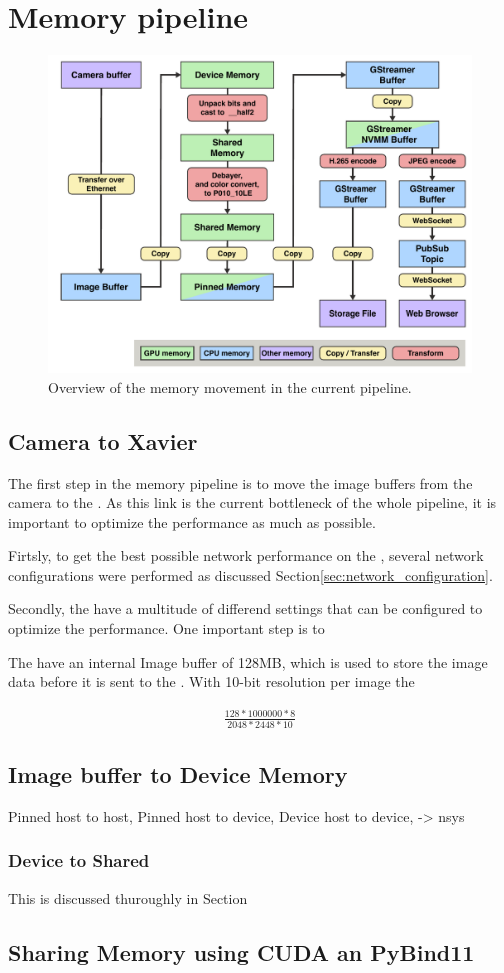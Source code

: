 \section{Memory pipeline}

\begin{figure}[H]
    \centering
    \includegraphics[width=\textwidth]{figures/memory_pipeline/current.pdf}
    \caption{Overview of the memory movement in the current pipeline.}
    \label{fig:pipeline_current}
\end{figure}



\subsection{Camera to Xavier}
The first step in the memory pipeline is to move the image buffers from the camera to the \jx.
As this link is the current bottleneck of the whole pipeline, it is important to optimize the performance as much as possible.

Firtsly, to get the best possible network performance on the \jx, several network configurations were performed as discussed Section\ref{sec:network_configuration}.

Secondly, the \cams have a multitude of differend settings that can be configured to optimize the performance.
One important step is to

The \cams have an internal Image buffer of 128MB, which is used to store the image data before it is sent to the \jx.
With 10-bit resolution per image the


\begin{align}
    \frac{128*1000000*8}{2048*2448*10}
\end{align}

\subsection{Image buffer to Device Memory}
Pinned host to host,
Pinned host to device,
Device host to device, -> nsys

\subsubsection{Device to Shared}
This is discussed thuroughly in Section



\subsection{Sharing Memory using CUDA an PyBind11}